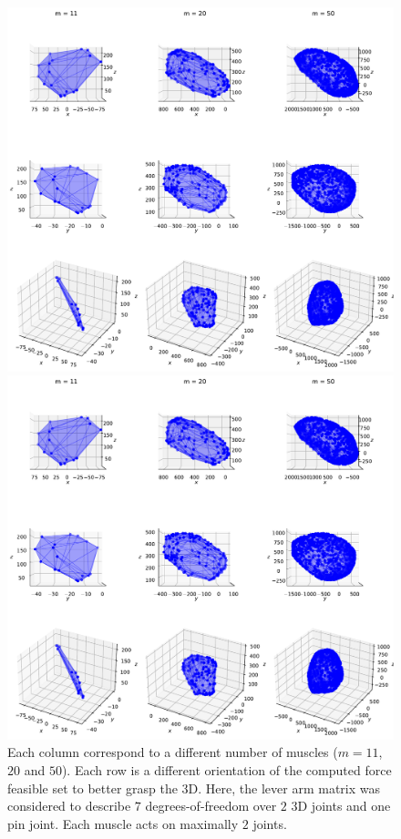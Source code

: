 \begin{figure}[!htb]
\begin{minipage}{1\linewidth}
    \end{minipage}
    \begin{minipage}{1\linewidth}
        \centering
        \includegraphics[trim={0 255 0 300},clip, width=0.9\linewidth]{img/chapter_3/zonotopes_looks_like_ellipsoids_2.pdf}
    \end{minipage}
    \begin{minipage}{1\linewidth}
        \centering
        \includegraphics[trim={0 0 0 500},clip, width=0.9\linewidth]{img/chapter_3/zonotopes_looks_like_ellipsoids_2.pdf}
    \end{minipage}
    
    \caption{Each column correspond to a different number of muscles ($m=11$, $20$ and $50$). Each row is a different orientation of the computed force feasible set to better grasp the 3D. Here, the lever arm matrix was considered to describe $7$ degrees-of-freedom over $2$ 3D joints and one pin joint. Each muscle acts on maximally $2$ joints.}
    \label{fig:example_ellipsoidal_zonotope_bijoints}
\end{figure}

